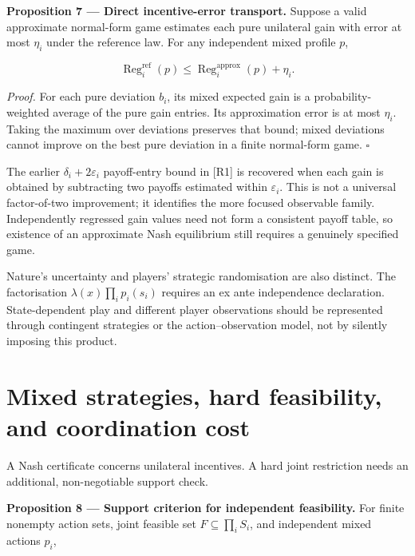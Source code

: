 \documentclass[11pt,a4paper]{article}
\begin{document}

\textbf{Proposition 7 --- Direct incentive-error transport.} Suppose a
valid approximate normal-form game estimates each pure unilateral gain
with error at most \(\eta_i\) under the reference law. For any
independent mixed profile \(p\),

\nopagebreak[4]

\[
\operatorname{Reg}^{\mathrm{ref}}_i(p)
 \le\operatorname{Reg}^{\mathrm{approx}}_i(p)+\eta_i.
\]

\emph{Proof.} For each pure deviation \(b_i\), its mixed expected gain
is a probability-weighted average of the pure gain entries. Its
approximation error is at most \(\eta_i\). Taking the maximum over
deviations preserves that bound; mixed deviations cannot improve on the
best pure deviation in a finite normal-form game. \(\square\)

The earlier \(\delta_i+2\varepsilon_i\) payoff-entry bound in {[}R1{]}
is recovered when each gain is obtained by subtracting two payoffs
estimated within \(\varepsilon_i\). This is not a universal
factor-of-two improvement; it identifies the more focused observable
family. Independently regressed gain values need not form a consistent
payoff table, so existence of an approximate Nash equilibrium still
requires a genuinely specified game.

Nature's uncertainty and players' strategic randomisation are also
distinct. The factorisation \(\lambda(x)\prod_i p_i(s_i)\) requires an
ex ante independence declaration. State-dependent play and different
player observations should be represented through contingent strategies
or the action--observation model, not by silently imposing this product.

\section{Mixed strategies, hard feasibility, and coordination
cost}\label{mixed-strategies-hard-feasibility-and-coordination-cost}

A Nash certificate concerns unilateral incentives. A hard joint
restriction needs an additional, non-negotiable support check.


\textbf{Proposition 8 --- Support criterion for independent
feasibility.} For finite nonempty action sets, joint feasible set
\(F\subseteq\prod_i S_i\), and independent mixed actions \(p_i\),

\nopagebreak[4]
\end{document}

